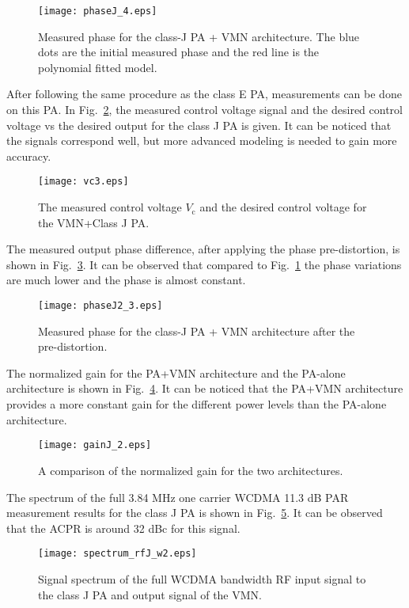 \documentclass[10pt,journal]{IEEEtran}
\begin{document}
\begin{figure}
\centering
\texttt{[image: phaseJ\_4.eps]}
\caption{Measured phase for the class-J PA + VMN architecture. The blue dots are the initial measured phase and the red line is the polynomial fitted model.}
\label{phaseJ}
\end{figure}

After following the same procedure as the class E PA, measurements can be done on this PA. In Fig.~\ref{vc}, the measured control voltage signal and the desired control voltage vs the desired output for the class J PA is given. It can be noticed that the signals correspond well, but more advanced modeling is needed to gain more accuracy.

\begin{figure}
\centering
\texttt{[image: vc3.eps]}
\caption{The measured control voltage $V_\text{c}$ and the desired control voltage for the VMN+Class J PA.}
\label{vc}
\end{figure}

The measured output phase difference, after applying the phase pre-distortion, is shown in Fig.~\ref{phaseJ1}. It can be observed that compared to Fig.~\ref{phaseJ} the phase variations are much lower and the phase is almost constant.

\begin{figure}
\centering
\texttt{[image: phaseJ2\_3.eps]}
\caption{Measured phase for the class-J PA + VMN architecture after the pre-distortion.}
\label{phaseJ1}
\end{figure}

The normalized gain for the PA+VMN architecture and the PA-alone architecture is shown in Fig.~\ref{gainJ}. It can be noticed that the PA+VMN architecture provides a more constant gain for the different power levels than the PA-alone architecture.

\begin{figure}
\centering
\texttt{[image: gainJ\_2.eps]}
\caption{A comparison of the normalized gain for the two architectures.}
\label{gainJ}
\end{figure}

The spectrum of the full 3.84 MHz one carrier WCDMA 11.3 dB PAR measurement results for the class J PA is shown in Fig.~\ref{spct_rfJ_w}. It can be observed that the ACPR is around 32 dBc for this signal.

\begin{figure}
\centering
\texttt{[image: spectrum\_rfJ\_w2.eps]}
\caption{Signal spectrum of the full WCDMA bandwidth RF input signal to the class J PA and output signal of the VMN.} \label{spct_rfJ_w}
\end{figure}
\end{document}
